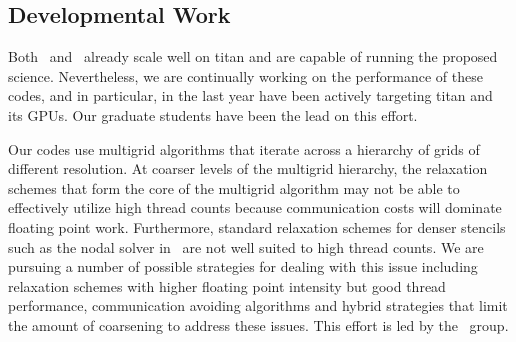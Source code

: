 \subsection{Developmental Work}


Both \maestro\ and \castro\ already scale well on titan and are
capable of running the proposed science.  Nevertheless, we are
continually working on the performance of these codes, and in
particular, in the last year have been actively targeting titan and
its GPUs.  Our graduate students have been the lead on this effort.



Our codes use multigrid algorithms that iterate across a hierarchy of
grids of different resolution. At coarser levels of the multigrid
hierarchy, the relaxation schemes that form the core of the multigrid
algorithm may not be able to effectively utilize high thread counts
because communication costs will dominate floating point
work. Furthermore, standard relaxation schemes for denser stencils
such as the nodal solver in \maestro\ are not well suited to high thread
counts. We are pursuing a number of possible strategies for dealing
with this issue including relaxation schemes with higher floating
point intensity but good thread performance, communication avoiding
algorithms and hybrid strategies that limit the amount of coarsening
to address these issues.  This effort is led by the \boxlib\ group.

